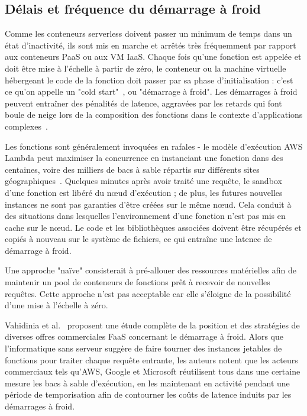 \subsection{Délais et fréquence du démarrage à froid}
\label{sota-cold-start}

Comme les conteneurs serverless doivent passer un minimum de temps dans un état d'inactivité, ils sont mis en marche et arrêtés très fréquemment par rapport aux conteneurs PaaS ou aux VM IaaS. Chaque fois qu'une fonction est appelée et doit être mise à l'échelle à partir de zéro, le conteneur ou la machine virtuelle hébergeant le code de la fonction doit passer par sa phase d'initialisation : c'est ce qu'on appelle un "cold start"~\cite{lloydImprovingApplicationMigration2018}, ou "démarrage à froid". Les démarrages à froid peuvent entraîner des pénalités de latence, aggravées par les retards qui font boule de neige lors de la composition des fonctions dans le contexte d'applications complexes~\cite{mohanAgileColdStartsa}.

Les fonctions sont généralement invoquées en rafales - le modèle d'exécution AWS Lambda peut maximiser la concurrence en instanciant une fonction dans des centaines, voire des milliers de bacs à sable répartis sur différents sites géographiques~\cite{aws-lambda-scaling}. Quelques minutes après avoir traité une requête, le sandbox d'une fonction est libéré du nœud d'exécution ; de plus, les futures nouvelles instances ne sont pas garanties d'être créées sur le même nœud. Cela conduit à des situations dans lesquelles l'environnement d'une fonction n'est pas mis en cache sur le nœud. Le code et les bibliothèques associées doivent être récupérés et copiés à nouveau sur le système de fichiers, ce qui entraîne une latence de démarrage à froid.

Une approche "naïve" consisterait à pré-allouer des ressources matérielles afin de maintenir un pool de conteneurs de fonctions prêt à recevoir de nouvelles requêtes. Cette approche n'est pas acceptable car elle s'éloigne de la possibilité d'une mise à l'échelle à zéro.

Vahidinia et al.~\cite{vahidiniaColdStartServerless2020} proposent une étude complète de la position et des stratégies de diverses offres commerciales FaaS concernant le démarrage à froid. Alors que l'informatique sans serveur suggère de faire tourner des instances jetables de fonctions pour traiter chaque requête entrante, les auteurs notent que les acteurs commerciaux tels qu'AWS, Google et Microsoft réutilisent tous dans une certaine mesure les bacs à sable d'exécution, en les maintenant en activité pendant une période de temporisation afin de contourner les coûts de latence induits par les démarrages à froid.

